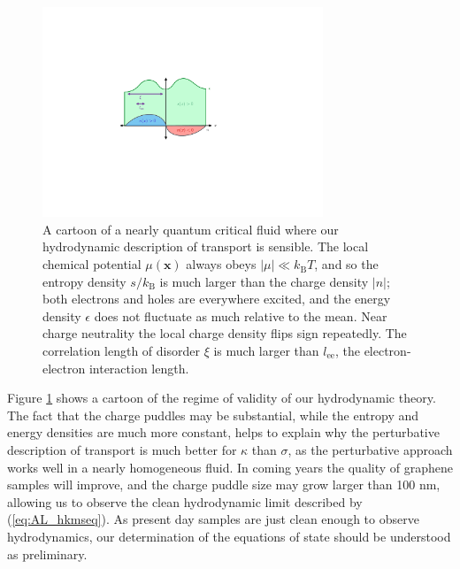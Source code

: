 \begin{figure}[t]
\centering
\includegraphics[width=3.3in]{figures/hydro_theory/hydrofig.pdf}
\caption{A cartoon of a nearly quantum critical fluid where our hydrodynamic description of transport is sensible.   The local chemical potential $\mu(\mathbf{x})$ always obeys $|\mu| \ll k_{\mathrm{B}}T$,  and so the entropy density $s/k_{\mathrm{B}}$ is much larger than the charge density $|n|$;  both electrons and holes are everywhere excited, and the energy density $\epsilon$ does not fluctuate as much relative to the mean.  Near charge neutrality the local charge density flips sign repeatedly.   The correlation length of disorder $\xi$ is much larger than $l_{\mathrm{ee}}$, the electron-electron interaction length.}
\label{fig:AL_hydrofig}
\end{figure}

Figure \ref{fig:AL_hydrofig} shows a cartoon of the regime of validity of our hydrodynamic theory.   The fact that the charge puddles may be substantial, while the entropy and energy densities are much more constant,  helps to explain why the perturbative description of transport is much better for $\kappa$ than $\sigma$,  as the perturbative approach works well in a nearly homogeneous fluid.  In coming years the quality of graphene samples will improve, and the charge puddle size may grow larger than 100 nm, allowing us to observe the clean hydrodynamic limit described by (\ref{eq:AL_hkmseq}).   As present day samples are just clean enough to observe hydrodynamics, our determination of the equations of state should be understood as preliminary.


